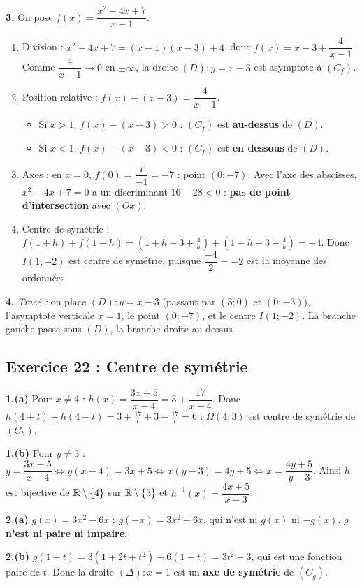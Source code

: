 \textbf{3.} On pose $f(x)=\dfrac{x^2-4x+7}{x-1}$.
\begin{enumerate}[label=(\alph*)]
  \item Division : $x^2-4x+7=(x-1)(x-3)+4$, donc $f(x)=x-3+\dfrac{4}{x-1}$.
  Comme $\dfrac{4}{x-1}\to0$ en $\pm\infty$, la droite $(D):y=x-3$ est asymptote \`a $(C_f)$.
  \item Position relative : $f(x)-(x-3)=\dfrac{4}{x-1}$.
  \begin{itemize}
    \item Si $x>1$, $f(x)-(x-3)>0$ : $(C_f)$ est \textbf{au-dessus} de $(D)$.
    \item Si $x<1$, $f(x)-(x-3)<0$ : $(C_f)$ est \textbf{en dessous} de $(D)$.
  \end{itemize}
  \item Axes : en $x=0$, $f(0)=\dfrac{7}{-1}=-7$ : point $(0;-7)$. Avec l'axe des abscisses, $x^2-4x+7=0$ a un discriminant
  $16-28<0$ : \textbf{pas de point d'intersection} avec $(Ox)$.
  \item Centre de sym\'etrie : $f(1+h)+f(1-h)=(1+h-3+\tfrac4h)+(1-h-3-\tfrac4h)=-4$.
  Donc $I(1;-2)$ est centre de sym\'etrie, puisque $\dfrac{-4}{2}=-2$ est la moyenne des ordonn\'ees.
\end{enumerate}

\textbf{4.} \emph{Trac\'e :} on place $(D):y=x-3$ (passant par $(3;0)$ et $(0;-3)$), l'asymptote verticale $x=1$, le point $(0;-7)$,
et le centre $I(1;-2)$. La branche gauche passe sous $(D)$, la branche droite au-dessus.

\subsection{Exercice 22 : Centre de sym\'etrie}

\textbf{1.(a)} Pour $x\neq4$ : $h(x)=\dfrac{3x+5}{x-4}=3+\dfrac{17}{x-4}$. Donc $h(4+t)+h(4-t)=3+\frac{17}{t}+3-\frac{17}{t}=6$ :
$\Omega(4;3)$ est centre de sym\'etrie de $(C_h)$.

\textbf{1.(b)} Pour $y\neq3$ : $y=\dfrac{3x+5}{x-4}\iff y(x-4)=3x+5\iff x(y-3)=4y+5\iff x=\dfrac{4y+5}{y-3}$.
Ainsi $h$ est bijective de $\mathbb{R}\setminus\{4\}$ sur $\mathbb{R}\setminus\{3\}$ et
$\boxed{h^{-1}(x)=\dfrac{4x+5}{x-3}}$.

\textbf{2.(a)} $g(x)=3x^2-6x$ : $g(-x)=3x^2+6x$, qui n'est ni $g(x)$ ni $-g(x)$. \textbf{$g$ n'est ni paire ni impaire.}

\textbf{2.(b)} $g(1+t)=3(1+2t+t^2)-6(1+t)=3t^2-3$, qui est une fonction paire de $t$. Donc la droite $(\Delta):x=1$
est un \textbf{axe de sym\'etrie} de $(C_g)$.

